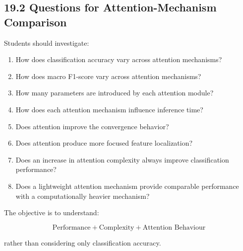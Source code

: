 \documentclass[10pt]{article}
\begin{document}
\subsection*{19.2 Questions for Attention-Mechanism Comparison}

Students should investigate:

\begin{enumerate}

\item How does classification accuracy vary across attention mechanisms?

\item How does macro F1-score vary across attention mechanisms?

\item How many parameters are introduced by each attention module?

\item How does each attention mechanism influence inference time?

\item Does attention improve the convergence behavior?

\item Does attention produce more focused feature localization?

\item Does an increase in attention complexity always improve classification
performance?

\item Does a lightweight attention mechanism provide comparable performance
with a computationally heavier mechanism?

\end{enumerate}

The objective is to understand:

\[
\boxed{
\text{Performance}
+
\text{Complexity}
+
\text{Attention Behaviour}
}
\]

rather than considering only classification accuracy.
\end{document}
